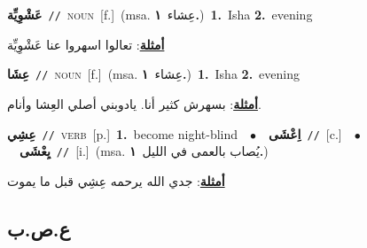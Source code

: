 \documentclass[10pt,a4paper,twoside]{article} %
\begin{document}
\begin{multicols}{2}
{\setlength\topsep{0pt}\textbf{\foreignlanguage{arabic}{عَشْوِيِّة}}\ {\color{gray}\texttt{//}\color{black}}\ \textsc{noun}\ [f.]\ \color{gray}(msa. \foreignlanguage{arabic}{عِشاء}~\foreignlanguage{arabic}{\textbf{١.}})\color{black}\ \textbf{1.}~Isha  \textbf{2.}~evening\  \begin{flushright}\color{gray}\foreignlanguage{arabic}{\textbf{\underline{\foreignlanguage{arabic}{أمثلة}}}: تعالوا اسهروا عنا عَشْوِيِّة}\end{flushright}\color{black}} \vspace{2mm}

{\setlength\topsep{0pt}\textbf{\foreignlanguage{arabic}{عِشَا}}\ {\color{gray}\texttt{//}\color{black}}\ \textsc{noun}\ [f.]\ \color{gray}(msa. \foreignlanguage{arabic}{عِشاء}~\foreignlanguage{arabic}{\textbf{١.}})\color{black}\ \textbf{1.}~Isha  \textbf{2.}~evening\  \begin{flushright}\color{gray}\foreignlanguage{arabic}{\textbf{\underline{\foreignlanguage{arabic}{أمثلة}}}: بسهرش كثير أنا. يادوبني أصلي العِشا وأنام.}\end{flushright}\color{black}} \vspace{2mm}

{\setlength\topsep{0pt}\textbf{\foreignlanguage{arabic}{عِشِي}}\ {\color{gray}\texttt{//}\color{black}}\ \textsc{verb}\ [p.]\ \textbf{1.}~become night-blind\ \ $\bullet$\ \ \setlength\topsep{0pt}\textbf{\foreignlanguage{arabic}{اِعْشَى}}\ {\color{gray}\texttt{//}\color{black}}\ [c.]\ \ $\bullet$\ \ \setlength\topsep{0pt}\textbf{\foreignlanguage{arabic}{يِعْشَى}}\ {\color{gray}\texttt{//}\color{black}}\ [i.]\ \color{gray}(msa. \foreignlanguage{arabic}{يُصاب بالعمى في الليل}~\foreignlanguage{arabic}{\textbf{١.}})\color{black}\  \begin{flushright}\color{gray}\foreignlanguage{arabic}{\textbf{\underline{\foreignlanguage{arabic}{أمثلة}}}: جدي الله يرحمه عِشِي قبل ما يموت}\end{flushright}\color{black}} \vspace{2mm}

\vspace{-3mm}
\subsection*{\color{blue}\foreignlanguage{arabic}{ع.ص.ب}\color{blue}{}} 


\end{multicols}
\end{document}
